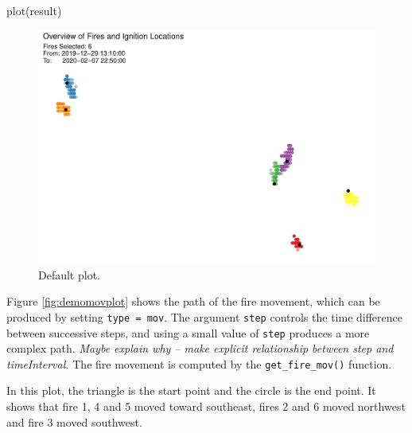 \begin{Schunk}
\begin{Sinput}
plot(result)
\end{Sinput}
\begin{figure}

{\centering \includegraphics[width=0.8\linewidth]{clustering_paper_files/figure-latex/demodefplot-1} 

}

\caption[Default plot]{Default plot.}\label{fig:demodefplot}
\end{figure}
\end{Schunk}

Figure \ref{fig:demomovplot} shows the path of the fire movement, which
can be produced by setting
\texttt{type\ =\ \textquotesingle{}mov\textquotesingle{}}. The argument
\texttt{step} controls the time difference between successive steps, and
using a small value of \texttt{step} produces a more complex path.
\textit{Maybe explain why -- make explicit relationship between step and timeInterval.}
The fire movement is computed by the \texttt{get\_fire\_mov()} function.

In this plot, the triangle is the start point and the circle is the end
point. It shows that fire 1, 4 and 5 moved toward southeast, fires 2 and
6 moved northwest and fire 3 moved southwest.

